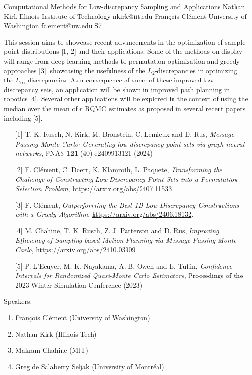 \begin{session}
 {Computational Methods for Low-discrepancy Sampling and Applications}%
 {Nathan Kirk}%
 {Illinois Institute of Technology}%
 {nkirk@iit.edu}%
 {François Clément}%
 {University of Washington}%
 {fclement@uw.edu}%
 {S7}%
{}

 This session aims to showcase recent advancements in the optimization of sample point distributions [1, 2] and their applications. Some of the methods on display will range from deep learning methods to permutation optimization and greedy approaches [3], showcasing the usefulness of the $L_2$-discrepancies in optimizing the $L_{\infty}$ discrepancies. As a consequence of some of these improved low-discrepancy sets, an application will be shown in improved path planning in robotics [4]. Several other applications will be explored in the context of using the median over the mean of $r$ RQMC estimates as proposed in several recent papers including [5].
 \medskip
 \begin{enumerate}
 \item[{[1]}] T. K. Rusch, N. Kirk, M. Bronstein, C. Lemieux and D. Rus, \textit{Message-Passing Monte Carlo: Generating low-discrepancy point sets via graph neural networks}, PNAS \textbf{121} (40) e2409913121 (2024)
 \item[{[2]}] F. Clément, C. Doerr, K. Klamroth, L. Paquete, \textit{Transforming the Challenge of Constructing Low-Discrepancy Point Sets into a Permutation Selection Problem}, \url{https://arxiv.org/abs/2407.11533}.
 \item[{[3]}] F. Cl\'ement, \textit{Outperforming the Best {1D} Low-Discrepancy Constructions with a Greedy Algorithm}, \url{https://arxiv.org/abs/2406.18132}.
 \item[{[4]}] M. Chahine, T. K. Rusch, Z. J. Patterson and D. Rus, \textit{Improving Efficiency of Sampling-based Motion Planning via Message-Passing Monte Carlo}, \url{https://arxiv.org/abs/2410.03909}
 \item[{[5]}] P. L'Ecuyer, M. K. Nayakama, A. B. Owen and B. Tuffin, \textit{Confidence Intervals for Randomized Quasi-Monte Carlo Estimators}, Proceedings of the 2023 Winter Simulation Conference (2023)
 \end{enumerate}
 Speakers:
 \begin{enumerate}
 \item François Clément (University of Washington)
 \item Nathan Kirk (Illinois Tech)
 \item Makram Chahine (MIT)
 \item Greg de Salaberry Seljak (University of Montréal)
 \end{enumerate}
\end{session}

